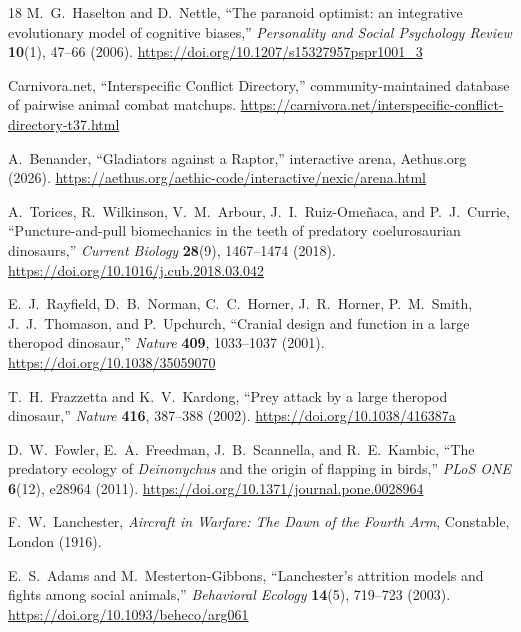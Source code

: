 \documentclass[11pt]{article}
\begin{document}
\begin{thebibliography}{18}
M.~G.~Haselton and D.~Nettle,
``The paranoid optimist: an integrative evolutionary model of cognitive biases,''
\textit{Personality and Social Psychology Review} \textbf{10}(1), 47--66 (2006).
\url{https://doi.org/10.1207/s15327957pspr1001_3}

Carnivora.net,
``Interspecific Conflict Directory,'' community-maintained database of pairwise animal combat matchups.
\url{https://carnivora.net/interspecific-conflict-directory-t37.html}

A.~Benander,
``Gladiators against a Raptor,'' interactive arena, Aethus.org (2026).
\url{https://aethus.org/aethic-code/interactive/nexic/arena.html}

A.~Torices, R.~Wilkinson, V.~M.~Arbour, J.~I.~Ruiz-Ome\~naca, and P.~J.~Currie,
``Puncture-and-pull biomechanics in the teeth of predatory coelurosaurian dinosaurs,''
\textit{Current Biology} \textbf{28}(9), 1467--1474 (2018).
\url{https://doi.org/10.1016/j.cub.2018.03.042}

E.~J.~Rayfield, D.~B.~Norman, C.~C.~Horner, J.~R.~Horner, P.~M.~Smith, J.~J.~Thomason, and P.~Upchurch,
``Cranial design and function in a large theropod dinosaur,''
\textit{Nature} \textbf{409}, 1033--1037 (2001).
\url{https://doi.org/10.1038/35059070}

T.~H.~Frazzetta and K.~V.~Kardong,
``Prey attack by a large theropod dinosaur,''
\textit{Nature} \textbf{416}, 387--388 (2002).
\url{https://doi.org/10.1038/416387a}

D.~W.~Fowler, E.~A.~Freedman, J.~B.~Scannella, and R.~E.~Kambic,
``The predatory ecology of \textit{Deinonychus} and the origin of flapping in birds,''
\textit{PLoS ONE} \textbf{6}(12), e28964 (2011).
\url{https://doi.org/10.1371/journal.pone.0028964}

F.~W.~Lanchester,
\textit{Aircraft in Warfare: The Dawn of the Fourth Arm},
Constable, London (1916).

E.~S.~Adams and M.~Mesterton-Gibbons,
``Lanchester's attrition models and fights among social animals,''
\textit{Behavioral Ecology} \textbf{14}(5), 719--723 (2003).
\url{https://doi.org/10.1093/beheco/arg061}
\end{thebibliography}
\end{document}
